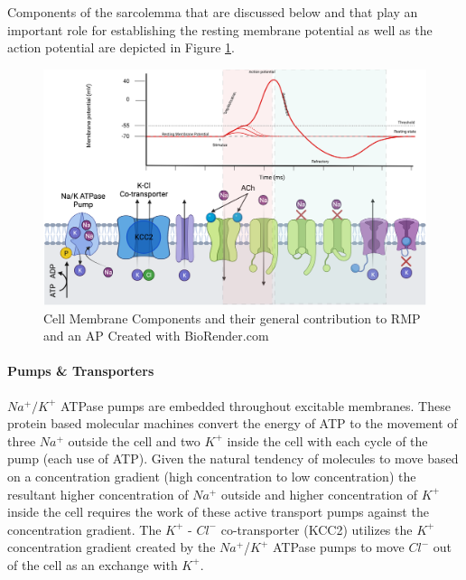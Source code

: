 Components of the sarcolemma that are discussed below and that play an important role for establishing the resting membrane potential as well as the action potential are depicted in Figure \ref{fig:cell_membrane}. 

\begin{figure}[!ht]
    \centering
    \includegraphics[width=1\linewidth]{./figure/cell_membrane.png}
    \caption{Cell Membrane Components and their general contribution to RMP and an AP \footnotesize{Created with BioRender.com}}
    \label{fig:cell_membrane}
\end{figure}


\paragraph{Pumps \& Transporters}
$Na^+/K^+$ ATPase pumps are embedded throughout excitable membranes. These protein based molecular machines convert the energy of ATP to the movement of three $Na^+$ outside the cell and two $K^+$ inside the cell with each cycle of the pump (each use of ATP). Given the natural tendency of molecules to move based on a concentration gradient (high concentration to low concentration) the resultant higher concentration of  $Na^+$ outside and higher concentration of $K^+$ inside the cell requires the work of these active transport pumps against the concentration gradient.
The $K^+$ - $Cl^-$ co-transporter (KCC2) utilizes the $K^+$ concentration gradient created by the $Na^+$/$K^+$ ATPase pumps to move $Cl^-$ out of the cell as an exchange with $K^+$.




